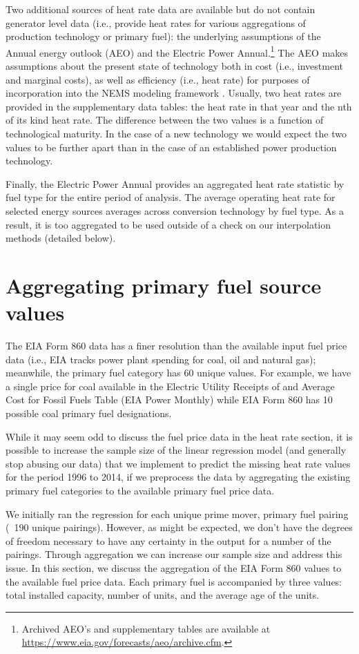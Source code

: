 \documentclass[10pt]{report}
\begin{document}
Two additional sources of heat rate data are available but do not contain generator level data (i.e., provide heat rates for various aggregations of production technology or primary fuel): the underlying assumptions of the Annual energy outlook (AEO) and the Electric Power Annual.\footnote{Archived AEO's and supplementary tables are available at  \url{https://www.eia.gov/forecasts/aeo/archive.cfm}.}
The AEO makes assumptions about the present state of technology both in cost (i.e., investment and marginal costs), as well as efficiency (i.e., heat rate) for purposes of incorporation into the NEMS modeling framework \parencite{eiaaeo2016}.
Usually, two heat rates are provided in the supplementary data tables: the heat rate in that year and the nth of its kind heat rate. 
The difference between the two values is a function of technological maturity.
In the case of a new technology we would expect the two values to be further apart than in the case of an established power production technology. 

Finally, the Electric Power Annual provides an aggregated heat rate statistic by fuel type for the entire period of analysis. 
The average operating heat rate for selected energy sources averages across conversion technology by fuel type.
As a result, it is too aggregated to be used outside of a check on our interpolation methods (detailed below). 

\section{Aggregating primary fuel source values}
The EIA Form 860 data has a finer resolution than the available input fuel price data (i.e., EIA tracks power plant spending for coal, oil and natural gas); meanwhile, the primary fuel category has 60 unique values.
For example, we have a single price for coal available in the Electric Utility Receipts of and Average Cost for Fossil Fuels Table \parencite{}(EIA Power Monthly) while EIA Form 860 has 10 possible coal primary fuel designations.   

While it may seem odd to discuss the fuel price data in the heat rate section, it is possible to increase the sample size of the linear regression model (and generally stop abusing our data) that we implement to predict the missing heat rate values for the period 1996 to 2014, if we preprocess the data by aggregating the existing primary fuel categories to the available primary fuel price data.

We initially ran the regression for each unique prime mover, primary fuel pairing (~190 unique pairings). 
However, as might be expected, we don't have the degrees of freedom necessary to have any certainty in the output for a number of the pairings. 
Through aggregation we can increase our sample size and address this issue.
In this section, we discuss the aggregation of the EIA Form 860 values to the available fuel price data.
Each primary fuel is accompanied by three values: total installed capacity, number of units, and the average age of the units.
 
\end{document}
